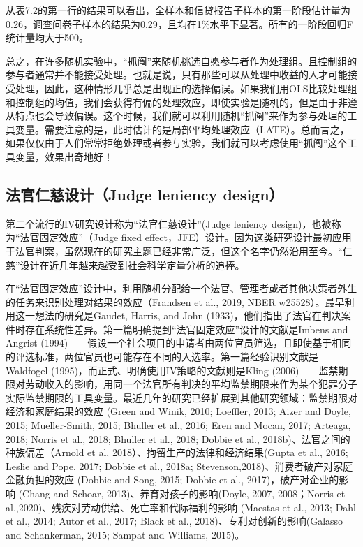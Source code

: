 \documentclass[cn,12pt,math=newtx,citestyle=gb7714-2015,bibstyle=gb7714-2015]{elegantbook}
\begin{document}
	从表7.2的第一行的结果可以看出，全样本和信贷报告子样本的第一阶段估计量为0.26，调查问卷子样本的结果为0.29，且均在1\%水平下显著。所有的一阶段回归F统计量均大于500。
	
	总之，在许多随机实验中，“抓阄”来随机挑选自愿参与者作为处理组。且控制组的参与者通常并不能接受处理。也就是说，只有那些可以从处理中收益的人才可能接受处理，因此，这种情形几乎总是出现正的选择偏误。如果我们用OLS比较处理组和控制组的均值，我们会获得有偏的处理效应，即使实验是随机的，但是由于非遵从特点也会导致偏误。这个时候，我们就可以利用随机“抓阄”来作为参与处理的工具变量。需要注意的是，此时估计的是局部平均处理效应（LATE）。总而言之，如果仅仅由于人们常常拒绝处理或者参与实验，我们就可以考虑使用“抓阄”这个工具变量，效果出奇地好！

	
	
	\subsection{法官仁慈设计（Judge leniency design）}
	
	第二个流行的IV研究设计称为“法官仁慈设计”(Judge leniency design)，也被称为“法官固定效应”（Judge fixed effect，JFE）设计。因为这类研究设计最初应用于法官判案，虽然现在的研究主题已经非常广泛，但这个名字仍然沿用至今。“仁慈”设计在近几年越来越受到社会科学定量分析的追捧。
	
	在“法官固定效应”设计中，利用随机分配给一个法官、管理者或者其他决策者外生的任务来识别处理对结果的效应（\href{https://www.nber.org/system/files/working_papers/w25528/w25528.pdf}{Frandsen et al., 2019, NBER w25528}）。最早利用这一想法的研究是Gaudet, Harris, and John (1933)，他们指出了法官在判决案件时存在系统性差异。第一篇明确提到“法官固定效应”设计的文献是Imbens and Angrist (1994)——假设一个社会项目的申请者由两位官员筛选，且即使基于相同的评选标准，两位官员也可能存在不同的入选率。第一篇经验识别文献是Waldfogel (1995)，而正式、明确使用IV策略的文献则是Kling (2006)——监禁期限对劳动收入的影响，用同一个法官所有判决的平均监禁期限来作为某个犯罪分子实际监禁期限的工具变量。最近几年的研究已经扩展到其他研究领域：监禁期限对经济和家庭结果的效应 (Green and Winik, 2010; Loeffler, 2013; Aizer and Doyle,
	2015; Mueller-Smith, 2015; Bhuller et al., 2016; Eren and Mocan, 2017; Arteaga, 2018; Norris et al., 2018; Bhuller et al., 2018; Dobbie et al., 2018b)、法官之间的种族偏差（Arnold et al, 2018）、拘留生产的法律和经济结果(Gupta et al., 2016; Leslie and Pope, 2017; Dobbie et al., 2018a; Stevenson,2018)、消费者破产对家庭金融负担的效应 (Dobbie and Song, 2015; Dobbie et al., 2017)，破产对企业的影响 (Chang and Schoar, 2013)、养育对孩子的影响(Doyle, 2007, 2008；Norris et al.,2020)、残疾对劳动供给、死亡率和代际福利的影响 (Maestas et al., 2013; Dahl et al., 2014; Autor et al., 2017; Black et al., 2018)、专利对创新的影响(Galasso and Schankerman, 2015; Sampat and Williams, 2015)。
	
\end{document}
